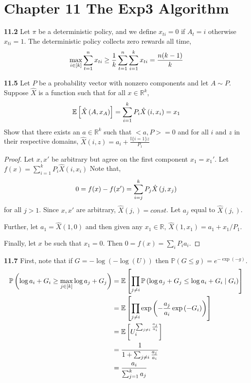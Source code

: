 \chapter*{Chapter 11 The Exp3 Algorithm}
\label{sec:11}

\noindent\textbf{11.2} Let $\pi$ be a deterministic policy, and we define $x_{ti}=0$ if $A_t=i$ otherwise $x_{ti}=1$. The deterministic policy collects zero rewards all time,
\begin{equation}
    \max _{i \in[k]} \sum_{t=1}^{n} x_{t i} \geq \frac{1}{k} \sum_{t=1}^{n} \sum_{i=1}^{k} x_{t i}=\frac{n(k-1)}{k} \notag
\end{equation}

\noindent\textbf{11.5} Let $P$ be a probability vector with nonzero components and let $A\sim P$. Suppose $\hat{X}$ is a function such that for all $x\in \mathbb{R}^k$,
\begin{equation}
    \mathbb{E}\left[\hat{X}\left(A, x_{A}\right)\right]=\sum_{i=1}^{k} P_{i} \hat{X}\left(i, x_{i}\right)=x_{1}\notag
\end{equation}
Show that there exists an $a\in \mathbb{R}^k$ such that $<a,P>=0$ and for all $i$ and $z$ in their respective domains, $\hat{X}(i, z)=a_{i}+\frac{\mathbb{I}\{i=1\} z}{P_{1}}$
\begin{proof}
    Let $x, x'$ be arbitrary but agree on the first component $x_1=x_1'$. Let $f(x)=\sum_{i=1}^{k} P_{i} \hat{X}\left(i, x_{i}\right)$ Note that,
    \begin{equation}
        0=f(x)-f(x')=\sum_{i=j}^{k} P_{j} \hat{X}\left(j, x_{j}\right)\notag
    \end{equation}
    for all $j>1$. Since $x, x'$ are arbitrary, $\hat{X}(j, )=const$. Let $a_j$ equal to $\hat{X}(j, )$.
    \par Further, let $a_1=\hat{X}(1, 0)$ and then given any $x_1\in \mathbb{R}$, $\hat{X}\left(1, x_{1}\right)=a_{1}+x_{1} / P_{1}$.
    \par Finally, let $x$ be such that $x_1=0$. Then $0=f(x)=\sum_{i} P_{i} a_{i}$.
\end{proof}

\noindent\textbf{11.7} First, note that if $G=-\log (-\log (U))$ then $\mathbb{P}(G \leq g)=e^{-\exp (-g)}$.
\begin{equation}
    \begin{aligned}
        \mathbb{P}\left(\log a_{i}+G_{i} \geq \max _{j \in[k]} \log a_{j}+G_{j}\right) &=\mathbb{E}\left[\prod_{j \neq i} \mathbb{P}\left(\log a_{j}+G_{j} \leq \log a_{i}+G_{i} \mid G_{i}\right)\right] \notag\\
        &=\mathbb{E}\left[\prod_{j \neq i} \exp \left(-\frac{a_{j}}{a_{i}} \exp \left(-G_{i}\right)\right)\right] \notag\\
        &=\mathbb{E}\left[U_{i}^{\sum_{j \neq i} \frac{a_{j}}{a_{i}}}\right] \notag\\
        &=\frac{1}{1+\sum_{j \neq i} \frac{a_{j}}{a_{i}}} \notag\\
        &=\frac{a_{i}}{\sum_{j=1}^{k} a_{j}}\notag
        \end{aligned}
\end{equation}

